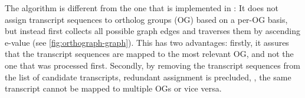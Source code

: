 The \pname algorithm is different from the one that is implemented in \hamstr:
It does not assign transcript sequences to ortholog groups (OG) based on a
per-OG basis, but instead first collects all possible graph edges  and traverses
them by ascending  e-value (see \autoref{fig:orthograph-graph}).
This has two advantages: firstly, it assures that the transcript sequences are
mapped to the most relevant OG, and not the one that was processed first.
Secondly, by removing the transcript sequences from the list of candidate
transcripts, redundant assignment is precluded, \ie, the same transcript cannot
be mapped to multiple OGs or vice versa.
